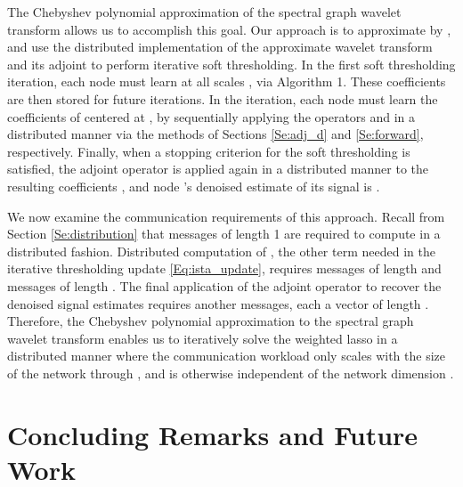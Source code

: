 \documentclass[conference]{IEEEtran}
\begin{document}
The Chebyshev polynomial approximation of the spectral graph wavelet transform
allows us to accomplish this goal.
Our approach is to approximate  by , and use the distributed implementation of the approximate wavelet transform and its adjoint to
perform iterative soft thresholding.
In the first soft thresholding iteration, each node  must learn  at all scales , via Algorithm 1. These coefficients are then stored for future iterations. In the  iteration, each node  must learn the  coefficients of  centered at , by sequentially applying the operators  and  in a distributed manner via the methods of Sections \ref{Se:adj_d} and \ref{Se:forward}, respectively. Finally, when a stopping criterion for the soft thresholding is satisfied,
the adjoint operator  is applied again in a distributed manner to the resulting coefficients , and node 's denoised estimate of its signal is .

We now examine the communication requirements of this approach. Recall from Section \ref{Se:distribution} that
 messages of length 1 are required to compute  in a distributed fashion.
Distributed computation of , the other term needed in the iterative thresholding update \eqref{Eq:ista_update}, requires  messages of length  and  messages of length . The final application of the adjoint operator  to recover the denoised signal estimates requires another  messages, each a vector of length . Therefore, the Chebyshev polynomial approximation to the spectral graph wavelet transform enables us to iteratively solve the weighted lasso in a distributed manner where the communication workload only scales with the  size of the network through , and is otherwise independent of the network dimension .

\section{Concluding Remarks and Future Work} \label{Se:conclusion}
\end{document}
